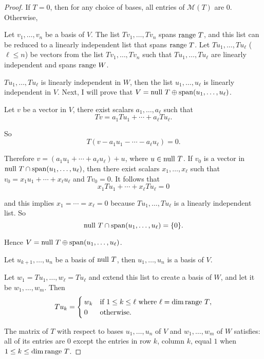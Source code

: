 \begin{proof}
    If $T = 0$, then for any choice of bases, all entries of $\mathcal{M}(T)$ are $0$. Otherwise,

    Let $v_{1}, \ldots, v_{n}$ be a basis of $V$. The list $Tv_{1}, \ldots, Tv_{n}$ spans $\operatorname{range}\,{T}$, and this list can be reduced to a linearly independent list that spans $\operatorname{range}\,{T}$. Let $Tu_{1}, \ldots, Tu_{\ell}$ ($\ell\leq n$) be vectors from the list $Tv_{1}, \ldots, Tv_{n}$ such that $Tu_{1}, \ldots, Tu_{\ell}$ are linearly independent and spans $\operatorname{range}\,{W}$.

    $Tu_{1}, \ldots, Tu_{\ell}$ is linearly independent in $W$, then the list $u_{1}, \ldots, u_{\ell}$ is linearly independent in $V$. Next, I will prove that $V = \operatorname{null}\,{T} \oplus\operatorname{span}(u_{1}, \ldots, u_{\ell})$.

    Let $v$ be a vector in $V$, there exist scalars $a_{1}, \ldots, a_{\ell}$ such that
    \[
        Tv = a_{1}Tu_{1} + \cdots + a_{\ell}Tu_{\ell}.
    \]

    So
    \[
        T(v - a_{1}u_{1} - \cdots - a_{\ell}u_{\ell}) = 0.
    \]

    Therefore $v = (a_{1}u_{1} + \cdots + a_{\ell}u_{\ell}) + u$, where $u\in\operatorname{null}\,{T}$. If $v_{0}$ is a vector in $\operatorname{null}\,{T}\cap \operatorname{span}(u_{1}, \ldots, u_{\ell})$, then there exist scalars $x_{1}, \ldots, x_{\ell}$ such that $v_{0} = x_{1}u_{1} + \cdots + x_{\ell}u_{\ell}$ and $Tv_{0} = 0$. It follows that
    \[
        x_{1}Tu_{1} + \cdots + x_{\ell}Tu_{\ell} = 0
    \]

    and this implies $x_{1} = \cdots = x_{\ell} = 0$ because $Tu_{1}, \ldots, Tu_{\ell}$ is a linearly independent list. So
    \[
        \operatorname{null}\,{T}\cap\operatorname{span}(u_{1}, \ldots, u_{\ell}) = \{0\}.
    \]

    Hence $V = \operatorname{null}\,{T}\oplus\operatorname{span}(u_{1}, \ldots, u_{\ell})$.

    Let $u_{k+1}, \ldots, u_{n}$ be a basis of $\operatorname{null}\,{T}$, then $u_{1}, \ldots, u_{n}$ is a basis of $V$.

    Let $w_{1} = Tu_{1}, \ldots, w_{\ell} = Tu_{\ell}$ and extend this list to create a basis of $W$, and let it be $w_{1}, \ldots, w_{m}$. Then
    \[
        Tu_{k} = \begin{cases}
            w_{k} & \text{if $1\leq k\leq \ell$ where $\ell = \dim\operatorname{range}\,{T}$}, \\
            0     & \text{otherwise}.
        \end{cases}
    \]

    The matrix of $T$ with respect to bases $u_{1}, \ldots, u_{n}$ of $V$ and $w_{1}, \ldots, w_{m}$ of $W$ satisfies: all of its entries are $0$ except the entries in row $k$, column $k$, equal $1$ when $1\leq k\leq \dim\operatorname{range}\,{T}$.
\end{proof}
\newpage

